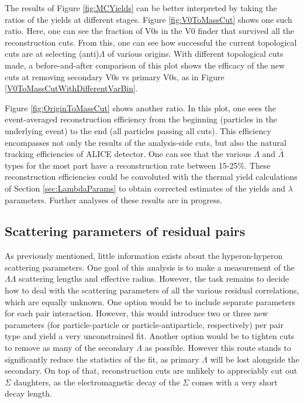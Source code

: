 The results of Figure \ref{fig:MCYields} can be better interpreted by taking the ratios of the yields at different stages.  Figure \ref{fig:V0ToMassCut} shows one such ratio.  Here, one can see the fraction of V0s in the V0 finder that survived all the reconstruction cuts.  From this, one can see how successful the current topological cuts are at selecting (anti)$\Lambda$ of various origins.  With different topological cuts made, a before-and-after comparison of this plot shows the efficacy of the new cuts at removing secondary V0s vs primary V0s, as in Figure \ref{V0ToMassCutWithDifferentVarBin}.

Figure \ref{fig:OriginToMassCut} shows another ratio.  In this plot, one sees the event-averaged reconstruction efficiency from the beginning (particles in the underlying event) to the end (all particles passing all cuts).  This efficiency encompasses not only the results of the analysis-side cuts, but also the natural tracking efficiencies of ALICE detector.  One can see that the various $\Lambda$ and $\bar{\Lambda}$ types for the most part have a reconstruction rate between 15-25\%.  These reconstruction efficiencies could be convoluted with the thermal yield calculations of Section \ref{sec:LambdaParams} to obtain corrected estimates of the yields and $\lambda$ parameters.  Further analyses of these results are in progress.


\subsection{Scattering parameters of residual pairs}
\label{sec:ScatteringParams}

As previously mentioned, little information exists about the hyperon-hyperon scattering parameters.  One goal of this analysis is to make a measurement of the $\Lambda\Lambda$ scattering lengths and effective radius.  However, the task remains to decide how to deal with the scattering parameters of all the various residual correlations, which are equally unknown.  One option would be to include separate parameters for each pair interaction.  However, this would introduce two or three new parameters (for particle-particle or particle-antiparticle, respectively) per pair type and yield a very unconstrained fit.  Another option would be to tighten cuts to remove as many of the secondary $\Lambda$ as possible.  However this route stands to significantly reduce the statistics of the fit, as primary $\Lambda$ will be lost alongside the secondary.  On top of that, reconstruction cuts are unlikely to appreciably cut out $\Sigma$ daughters, as the electromagnetic decay of the $\Sigma$ comes with a very short decay length.


